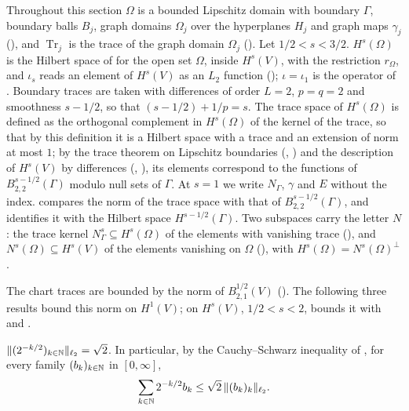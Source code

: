 Throughout this section $\Omega$ is a bounded Lipschitz domain with boundary $\Gamma$, boundary
balls $B_j$, graph domains $\Omega_j$ over the hyperplanes $H_j$ and graph maps $\gamma_j$
(), and $\operatorname{Tr}_j$ is the trace of the graph domain
$\Omega_j$ (). Let $1/2 < s < 3/2$. $H^s(\Omega)$ is the Hilbert space of
 for the open set $\Omega$, inside $H^s(V)$, with the
restriction $r_\Omega$, and $\iota_s$ reads an element of $H^s(V)$ as an $L_2$ function
(); $\iota = \iota_1$ is the operator of .
Boundary traces are taken with differences of order $L = 2$, $p = q = 2$ and smoothness
$s - 1/2$, so that $(s - 1/2) + 1/p = s$. The trace space of $H^s(\Omega)$ is defined as the
orthogonal complement in $H^s(\Omega)$ of the kernel of the trace, so that by this definition it
is a Hilbert space with a trace and an extension of norm at most $1$; by the trace theorem on
Lipschitz boundaries (, ) and
the description of $H^s(V)$ by differences (,
), its elements correspond to the functions of
$B^{s-1/2}_{2,2}(\Gamma)$ modulo null sets of $\Gamma$. At $s = 1$ we write $N_\Gamma$, $\gamma$
and $E$ without the index.  compares the norm of the trace space with
that of $B^{s-1/2}_{2,2}(\Gamma)$, and  identifies it with the
Hilbert space $H^{s-1/2}(\Gamma)$. Two subspaces carry the letter $N$: the
trace kernel $N^s_\Gamma \subseteq H^s(\Omega)$ of the elements with vanishing trace
(), and $N^s(\Omega) \subseteq H^s(V)$ of the elements vanishing on
$\Omega$ (), with $H^s(\Omega) = N^s(\Omega)^\perp$.

The chart traces are bounded by the norm of $B^{1/2}_{2,1}(V)$ (). The
following three results bound this norm on $H^1(V)$; on $H^s(V)$,
$1/2 < s < 2$,  bounds it with 
and .

\begin{lemma}
\label{lem:lq-cauchy-schwarz}
\leanok
{}
$\|(2^{-k/2})_{k \in \mathbb{N}}\|_{\ell_2} = \sqrt 2$. In particular, by the Cauchy--Schwarz
inequality of , for every family $(b_k)_{k \in \mathbb{N}}$ in
$[0, \infty]$,
\[
  \sum_{k \in \mathbb{N}} 2^{-k/2} b_k \leq \sqrt 2 \, \|(b_k)_k\|_{\ell_2} .
\]
\end{lemma}

